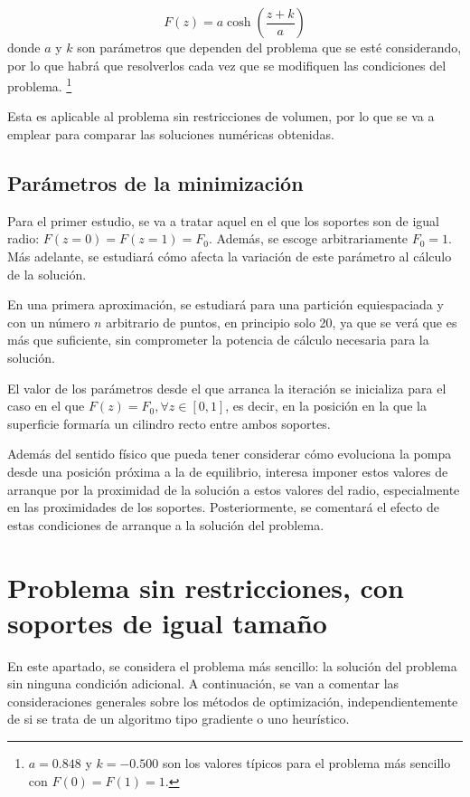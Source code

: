 \begin{equation} \label{eq:catenoide}
    F(z) = a \cosh \left( \frac{z + k}{a} \right)
\end{equation}
donde $a$ y $k$ son parámetros que dependen del problema que se esté considerando, por lo que habrá que resolverlos cada vez que se modifiquen las condiciones del problema. \footnote{$a = 0.848$ y $k = -0.500$ son los valores típicos para el problema más sencillo con $F(0) = F(1) = 1$.}

Esta es aplicable al problema sin restricciones de volumen, por lo que se va a emplear para comparar las soluciones numéricas obtenidas. 

\subsection{Parámetros de la minimización} \label{ap:params}

Para el primer estudio, se va a tratar aquel en el que los soportes son de igual radio: $F(z=0) = F(z=1) = F_0$. Además, se escoge arbitrariamente $F_0 = 1$. Más adelante, se estudiará cómo afecta la variación de este parámetro al cálculo de la solución.

En una primera aproximación, se estudiará para una partición equiespaciada y con un número $n$ arbitrario de puntos, en principio solo 20, ya que se verá que es más que suficiente, sin comprometer la potencia de cálculo necesaria para la solución.

El valor de los parámetros desde el que arranca la iteración se inicializa para el caso en el que $ F(z) = F_0 , \forall z \in [0, 1]$, es decir, en la posición en la que la superficie formaría un cilindro recto entre ambos soportes. 

Además del sentido físico que pueda tener considerar cómo evoluciona la pompa desde una posición próxima a la de equilibrio, interesa imponer estos valores de arranque por la proximidad de la solución a estos valores del radio, especialmente en las proximidades de los soportes. Posteriormente, se comentará el efecto de estas condiciones de arranque a la solución del problema.

\section{Problema sin restricciones, con soportes de igual tamaño}

En este apartado, se considera el problema más sencillo: la solución del problema sin ninguna condición adicional. A continuación, se van a comentar las consideraciones generales sobre los métodos de optimización, independientemente de si se trata de un algoritmo tipo gradiente o uno heurístico.

